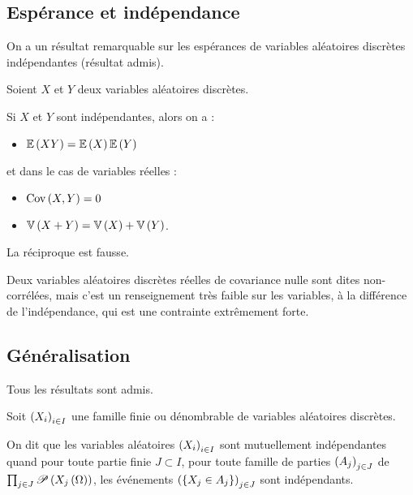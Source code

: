 \subsection{Espérance et indépendance}

On a un résultat remarquable sur les espérances de variables aléatoires discrètes indépendantes (résultat admis).

\begin{prop}
Soient \(X\) et \(Y\) deux variables aléatoires discrètes.

Si \(X\) et \(Y\) sont indépendantes, alors on a :

\begin{itemize}
    \item \(\operatorname{\mathbb{E}}\left(XY\right)=\operatorname{\mathbb{E}}\left(X\right)\operatorname{\mathbb{E}}\left(Y\right)\)
\end{itemize}

et dans le cas de variables réelles :

\begin{itemize}
    \item \(\operatorname{Cov}\left(X,Y\right)=0\) \\
    \item \(\operatorname{\mathbb{V}}\left(X+Y\right)=\operatorname{\mathbb{V}}\left(X\right)+\operatorname{\mathbb{V}}\left(Y\right)\).
\end{itemize}
\end{prop}

\begin{rem}
La réciproque est fausse.

Deux variables aléatoires discrètes réelles de covariance nulle sont dites non-corrélées, mais c'est un renseignement très faible sur les variables, à la différence de l'indépendance, qui est une contrainte extrêmement forte.
\end{rem}

\subsection{Généralisation}

Tous les résultats sont admis.

\begin{defi}
Soit \(\left(X_i\right)_{i\in I}\) une famille finie ou dénombrable de variables aléatoires discrètes.

On dit que les variables aléatoires \(\left(X_i\right)_{i\in I}\) sont mutuellement indépendantes quand pour toute partie finie \(J\subset I\), pour toute famille de parties \(\left(A_j\right)_{j\in J}\) de \(\prod_{j\in J}\mathscr{P}\left(X_j\left(\Omega\right)\right)\), les événements \(\left(\left\lbrace X_j\in A_j\right\rbrace\right)_{j\in J}\) sont indépendants.
\end{defi}

